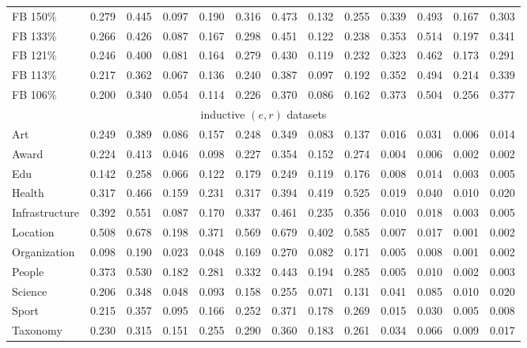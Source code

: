 \begin{table}[!ht]
\begin{adjustbox}{width=\textwidth}
\begin{tabular}{lcccccccccccc}
FB 150\% &0.279 &0.445 &0.097 &0.190 &0.316 &0.473 &0.132 &0.255 &0.339 &0.493 &0.167 &0.303 \\
FB 133\% &0.266 &0.426 &0.087 &0.167 &0.298 &0.451 &0.122 &0.238 &0.353 &0.514 &0.197 &0.341 \\
FB 121\% &0.246 &0.400 &0.081 &0.164 &0.279 &0.430 &0.119 &0.232 &0.323 &0.462 &0.173 &0.291 \\
FB 113\% &0.217 &0.362 &0.067 &0.136 &0.240 &0.387 &0.097 &0.192 &0.352 &0.494 &0.214 &0.339 \\
FB 106\% &0.200 &0.340 &0.054 &0.114 &0.226 &0.370 &0.086 &0.162 &0.373 &0.504 &0.256 &0.377 \\ \midrule
\multicolumn{13}{c}{inductive $(e, r)$ datasets} \\ \midrule
Art &0.249 &0.389 &0.086 &0.157 &0.248 &0.349 &0.083 &0.137 &0.016 &0.031 &0.006 &0.014 \\
Award &0.224 &0.413 &0.046 &0.098 &0.227 &0.354 &0.152 &0.274 &0.004 &0.006 &0.002 &0.002 \\
Edu &0.142 &0.258 &0.066 &0.122 &0.179 &0.249 &0.119 &0.176 &0.008 &0.014 &0.003 &0.005 \\
Health &0.317 &0.466 &0.159 &0.231 &0.317 &0.394 &0.419 &0.525 &0.019 &0.040 &0.010 &0.020 \\
Infrastructure &0.392 &0.551 &0.087 &0.170 &0.337 &0.461 &0.235 &0.356 &0.010 &0.018 &0.003 &0.005 \\
Location &0.508 &0.678 &0.198 &0.371 &0.569 &0.679 &0.402 &0.585 &0.007 &0.017 &0.001 &0.002 \\
Organization &0.098 &0.190 &0.023 &0.048 &0.169 &0.270 &0.082 &0.171 &0.005 &0.008 &0.001 &0.002 \\
People &0.373 &0.530 &0.182 &0.281 &0.332 &0.443 &0.194 &0.285 &0.005 &0.010 &0.002 &0.003 \\
Science &0.206 &0.348 &0.048 &0.093 &0.158 &0.255 &0.071 &0.131 &0.041 &0.085 &0.010 &0.020 \\
Sport &0.215 &0.357 &0.095 &0.166 &0.252 &0.371 &0.178 &0.269 &0.015 &0.030 &0.005 &0.008 \\
Taxonomy &0.230 &0.315 &0.151 &0.255 &0.290 &0.360 &0.183 &0.261 &0.034 &0.066 &0.009 &0.017 \\
\bottomrule
\end{tabular}
\end{adjustbox}
\end{table}

